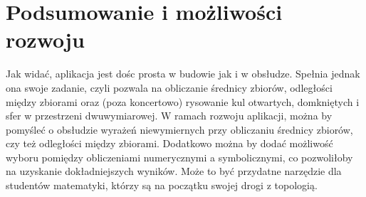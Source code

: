 \documentclass[article,11pt]{mwrep}
\begin{document}
\chapter{Podsumowanie i możliwości rozwoju}

Jak widać, aplikacja jest dośc prosta w budowie jak i w obsłudze. Spełnia jednak ona swoje zadanie, czyli pozwala na obliczanie średnicy zbiorów, odległości między zbiorami oraz (poza koncertowo) rysowanie kul otwartych, domkniętych i sfer w przestrzeni dwuwymiarowej. W ramach rozwoju aplikacji, można by pomyśleć o obsłudzie wyrażeń niewymiernych przy obliczaniu średnicy zbiorów, czy też odległości między zbiorami. Dodatkowo można by dodać możliwość wyboru pomiędzy obliczeniami numerycznymi a symbolicznymi, co pozwoliłoby na uzyskanie dokładniejszych wyników. Może to być przydatne narzędzie dla studentów matematyki, którzy są na początku swojej drogi z topologią.
\end{document}
